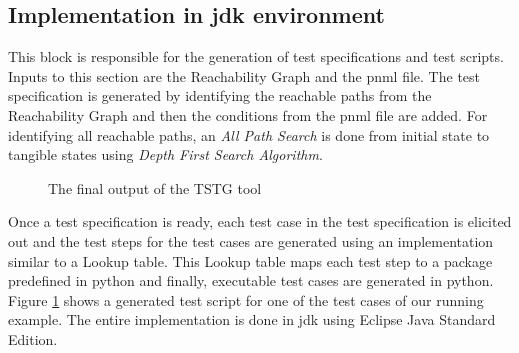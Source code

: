 \subsection{Implementation in \gls{jdk} environment}
This block is responsible for the generation of test specifications and test scripts. Inputs to this section are the Reachability Graph and the \gls{pnml} file. The test specification is generated by identifying the reachable paths from the Reachability Graph and then the conditions from the \gls{pnml} file are added. For identifying all reachable paths, an \textit{All Path Search} is done from initial state to tangible states using \textit{Depth First Search Algorithm}.

\begin{figure}[htb!]
\centering
{}
\caption{The final output of the TSTG tool}
\label{fig:testscript}
\end{figure}

Once a test specification is ready, each test case in the test specification is elicited out and the test steps for the test cases are generated using an implementation similar to a Lookup table. This Lookup table maps each test step to a package predefined in python and finally, executable test cases are generated in python. Figure \ref{fig:testscript} shows a generated test script for one of the test cases of our running example. The entire implementation is done in \gls{jdk} using Eclipse Java Standard Edition.
